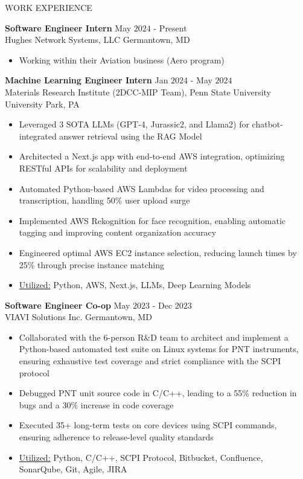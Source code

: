 \documentclass{resume} %
\begin{document}
\begin{rSection}{WORK EXPERIENCE}

{\bf Software Engineer Intern} \hfill May $2024$ - Present\\
Hughes Network Systems, LLC \hfill Germantown, MD
\begin{itemize}[itemsep = -4pt]
    \item Working within their Aviation business (Aero program) 
\end{itemize}

{\bf Machine Learning Engineer Intern} \hfill Jan $2024$ - May $2024$\\
Materials Research Institute (2DCC-MIP Team), Penn State University \hfill University Park, PA
\begin{itemize}[itemsep = -4pt]
    \item Leveraged 3 SOTA LLMs (GPT-4, Jurassic2, and Llama2) for chatbot-integrated answer retrieval using the RAG Model
    \item Architected a Next.js app with end-to-end AWS integration, optimizing RESTful APIs for scalability and deployment
    \item Automated Python-based AWS Lambdas for video processing and transcription, handling 50\% user upload surge
    \item Implemented AWS Rekognition for face recognition, enabling automatic tagging and improving content organization accuracy
    \item Engineered optimal AWS EC2 instance selection, reducing launch times by 25\% through precise instance matching
    \item \underline{Utilized:} Python, AWS, Next.js, LLMs, Deep Learning Models 
\end{itemize}

{\bf Software Engineer Co-op} \hfill May $2023$ - Dec $2023$\\
VIAVI Solutions Inc. \hfill Germantown, MD
\begin{itemize}[itemsep = -4pt]
    \item Collaborated with the $6$-person R\&D team to architect and implement a Python-based automated test suite on Linux systems for PNT instruments, ensuring exhaustive test coverage and strict compliance with the SCPI protocol
    \item Debugged PNT unit source code in C/C++, leading to a 55\% reduction in bugs and a 30\% increase in code coverage
    \item Executed 35+ long-term tests on core devices using SCPI commands, ensuring adherence to release-level quality standards
    \item \underline{Utilized:} Python, C/C++, SCPI Protocol, Bitbucket, Confluence, SonarQube, Git, Agile, JIRA
\end{itemize}


\end{rSection}
\end{document}
